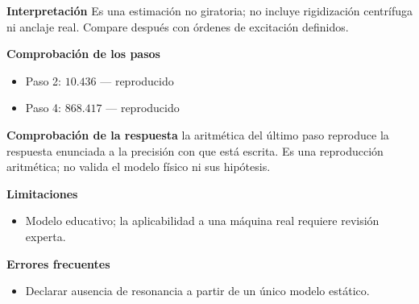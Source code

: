 \documentclass[10pt,openany]{book}
\begin{document}
\begin{tcolorbox}[title={Problema resuelto 4}, studiumworked, breakable]
\noindent\textbf{Interpretación}
Es una estimación no giratoria; no incluye rigidización centrífuga ni anclaje real. Compare después con órdenes de excitación definidos.

\noindent\textbf{Comprobación de los pasos}
\begin{itemize}
\item Paso 2: $10.436$ — reproducido
\item Paso 4: $868.417$ — reproducido
\end{itemize}

\noindent\textbf{Comprobación de la respuesta} la aritmética del último paso reproduce la respuesta enunciada a la precisión con que está escrita. Es una reproducción aritmética; no valida el modelo físico ni sus hipótesis.

\noindent\textbf{Limitaciones}
\begin{itemize}
\item Modelo educativo; la aplicabilidad a una máquina real requiere revisión experta.
\end{itemize}

\noindent\textbf{Errores frecuentes}
\begin{itemize}
\item Declarar ausencia de resonancia a partir de un único modelo estático.
\end{itemize}
\end{tcolorbox}
\end{document}
